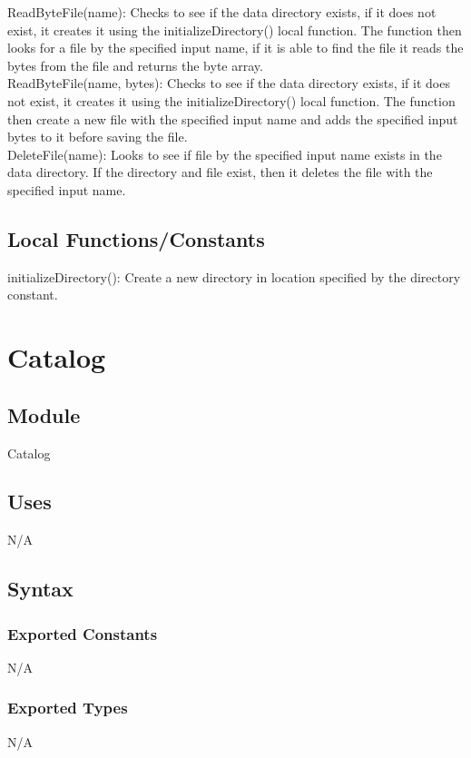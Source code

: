 \documentclass[12pt]{article}
\begin{document}
\noindent ReadByteFile(name): Checks to see if the data directory exists, if it does not exist, it creates it using the initializeDirectory() local function. The function then looks for a file by the specified input name, if it is able to find the file it reads the bytes from the file and returns the byte array.\\

\noindent ReadByteFile(name, bytes): Checks to see if the data directory exists, if it does not exist, it creates it using the initializeDirectory() local function. The function then create a new file with the specified input name and adds the specified input bytes to it before saving the file.\\

\noindent DeleteFile(name): Looks to see if file by the specified input name exists in the data directory. If the directory and file exist, then it deletes the file with the specified input name.\\

\subsection{Local Functions/Constants}
\noindent initializeDirectory(): Create a new directory in location specified by the directory constant.

\newpage

\section{Catalog}

\subsection{Module}
Catalog

\subsection{Uses}
N/A

\subsection{Syntax}
\subsubsection{Exported Constants}
N/A

\subsubsection{Exported Types}
N/A
\end{document}
